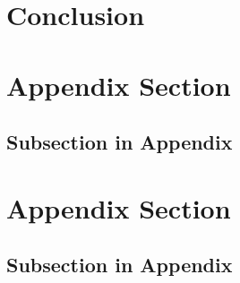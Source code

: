 \documentclass{tx}
\begin{document}
\section{Conclusion}
\lipsum[1-2]


\clearpage
\newpage



\clearpage
\newpage
\appendix

\section{Appendix Section}\label{sec:app-a}
\lipsum[3]
\subsection{Subsection in Appendix}
\lipsum[4]
\section{Appendix Section}\label{sec:app-b}
\lipsum[5]
\subsection{Subsection in Appendix}
\lipsum[6]
\end{document}
